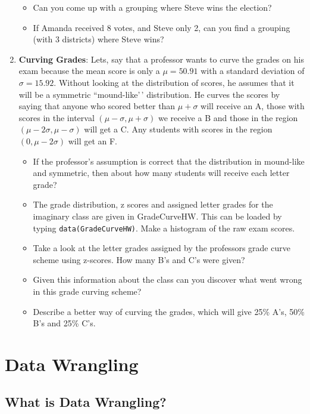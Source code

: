 \documentclass[
]{book}
\providecommand{\tightlist}{%
  \setlength{\itemsep}{0pt}\setlength{\parskip}{0pt}}
\theoremstyle{definition}
\theoremstyle{definition}
\theoremstyle{definition}
\theoremstyle{definition}
\theoremstyle{remark}
\begin{document}
\begin{enumerate}
  \begin{itemize}
  \tightlist
  \item
    Can you come up with a grouping where Steve wins the election?
  \item
    If Amanda received 8 votes, and Steve only 2, can you find a grouping (with 3 districts) where Steve wins?
  \end{itemize}
\item
  \textbf{Curving Grades}: Lets, say that a professor wants to curve the grades on his exam because the mean score is only a \(\mu=50.91\) with a standard deviation of \(\sigma=15.92\). Without looking at the distribution of scores, he assumes that it will be a symmetric ``mound-like'\,' distribution. He curves the scores by saying that anyone who scored better than \(\mu+\sigma\) will receive an A, those with scores in the interval \((\mu-\sigma, \mu+\sigma)\) we receive a B and those in the region \((\mu-2\sigma, \mu-\sigma)\) will get a C. Any students with scores in the region \((0, \mu-2\sigma)\) will get an F.

  \begin{itemize}
  \tightlist
  \item
    If the professor's assumption is correct that the distribution in mound-like and symmetric, then about how many students will receive each letter grade?
  \item
    The grade distribution, z scores and assigned letter grades for the imaginary class are given in GradeCurveHW. This can be loaded by typing \texttt{data(GradeCurveHW)}. Make a histogram of the raw exam scores.
  \item
    Take a look at the letter grades assigned by the professors grade curve scheme using z-scores. How many B's and C's were given?
  \item
    Given this information about the class can you discover what went wrong in this grade curving scheme?
  \item
    Describe a better way of curving the grades, which will give 25\% A's, 50\% B's and 25\% C's.
  \end{itemize}
\end{enumerate}

\hypertarget{data-wrangling}{%
\chapter{Data Wrangling}\label{data-wrangling}}

\hypertarget{what-is-data-wrangling}{%
\section{What is Data Wrangling?}\label{what-is-data-wrangling}}
\end{document}
